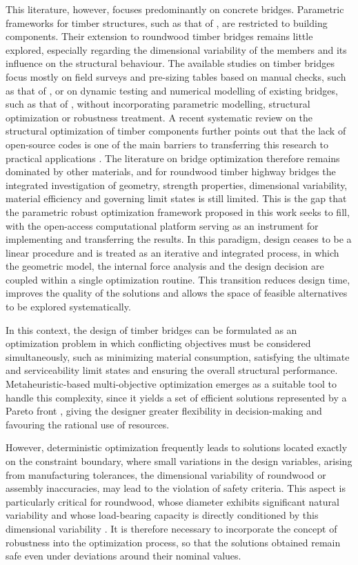 This literature, however, focuses predominantly on concrete bridges.
Parametric frameworks for timber structures, such as that of \textcite{Jiang2023}, are restricted to building components.
Their extension to roundwood timber bridges remains little explored, especially regarding the dimensional variability of the members and its influence on the structural behaviour.
The available studies on timber bridges focus mostly on field surveys and pre-sizing tables based on manual checks, such as that of \textcite{Criado2024}, or on dynamic testing and numerical modelling of existing bridges, such as that of \textcite{BERGENUDD2023115429}, without incorporating parametric modelling, structural optimization or robustness treatment.
A recent systematic review on the structural optimization of timber components further points out that the lack of open-source codes is one of the main barriers to transferring this research to practical applications \parencite{Belz2025}.
The literature on bridge optimization therefore remains dominated by other materials, and for roundwood timber highway bridges the integrated investigation of geometry, strength properties, dimensional variability, material efficiency and governing limit states is still limited.
This is the gap that the parametric robust optimization framework proposed in this work seeks to fill, with the open-access computational platform serving as an instrument for implementing and transferring the results.
In this paradigm, design ceases to be a linear procedure and is treated as an iterative and integrated process, in which the geometric model, the internal force analysis and the design decision are coupled within a single optimization routine.
This transition reduces design time, improves the quality of the solutions and allows the space of feasible alternatives to be explored systematically.

In this context, the design of timber bridges can be formulated as an optimization problem in which conflicting objectives must be considered simultaneously, such as minimizing material consumption, satisfying the ultimate and serviceability limit states and ensuring the overall structural performance.
Metaheuristic-based multi-objective optimization emerges as a suitable tool to handle this complexity, since it yields a set of efficient solutions represented by a Pareto front \parencite{DEB2009}, giving the designer greater flexibility in decision-making and favouring the rational use of resources.

However, deterministic optimization frequently leads to solutions located exactly on the constraint boundary, where small variations in the design variables, arising from manufacturing tolerances, the dimensional variability of roundwood or assembly inaccuracies, may lead to the violation of safety criteria.
This aspect is particularly critical for roundwood, whose diameter exhibits significant natural variability and whose load-bearing capacity is directly conditioned by this dimensional variability \parencite{Morgado2017}.
It is therefore necessary to incorporate the concept of robustness into the optimization process, so that the solutions obtained remain safe even under deviations around their nominal values.

